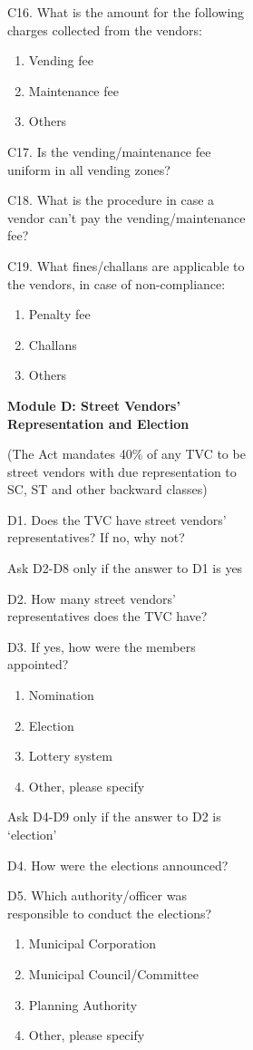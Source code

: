 \documentclass[a4paper, 12pt, twoside]{article}
\begin{document}
\begin{figure}
{\begin{figure}
\begin{figure}
\begin{mdframed}[backgroundcolor=gray!20]
\begin{enumerate}[nosep]
C16. What is the amount for the following charges collected from the vendors:
\begin{enumerate}[nosep]
\item Vending fee
\item Maintenance fee
\item Others
\end{enumerate}


C17. Is the vending/maintenance fee uniform in all vending zones?


C18. What is the procedure in case a vendor can’t pay the vending/maintenance fee?


C19. What fines/challans are applicable to the vendors, in case of non-compliance:
\begin{enumerate}[nosep]
\item Penalty fee
\item Challans
\item Others
\end{enumerate}

\textbf{Module D: Street Vendors’ Representation and Election}

(The Act mandates 40\% of any TVC to be street vendors with due representation to SC, ST and other backward classes)

D1. Does the TVC have street vendors’ representatives? If no, why not?

Ask D2-D8 only if the answer to D1 is yes

D2. How many street vendors’ representatives does the TVC have?

D3. If yes, how were the members appointed?
\begin{enumerate}[nosep]
\item Nomination
\item Election
\item Lottery system
\item Other, please specify
\end{enumerate}

Ask D4-D9 only if the answer to D2 is ‘election’

D4. How were the elections announced?

D5. Which authority/officer was responsible to conduct the elections?
\begin{enumerate}[nosep]
\item Municipal Corporation
\item Municipal Council/Committee
\item Planning Authority
\item Other, please specify
\end{enumerate}



\end{enumerate}
\end{mdframed}
\end{figure}
\end{figure}}
\end{figure}
\end{document}
